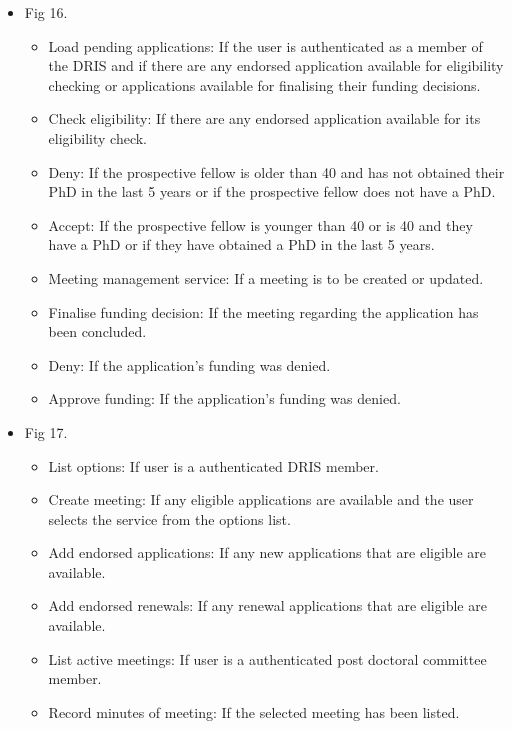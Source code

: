 \documentclass[12pt]{article}
\begin{document}
\begin{itemize}
	\item Fig 16.
		\begin{itemize}
			\item Load pending applications: If the user is authenticated as a member of the DRIS and if there are any endorsed application available for eligibility checking or applications available for finalising their funding decisions.
			\item Check eligibility: If there are any endorsed application available for its eligibility check.
			\item Deny: If the prospective fellow is older than 40 and has not obtained their PhD in the last 5 years or if the prospective fellow does not have a PhD.
			\item Accept: If the prospective fellow is younger than 40 or is 40 and they have a PhD or if they have obtained a PhD in the last 5 years.
			\item Meeting management service: If a meeting is to be created or updated. 
			\item Finalise funding decision: If the meeting regarding the application has been concluded.	
			\item Deny: If the application's funding was denied.			
			\item Approve funding: If the application's funding was denied.									
		\end{itemize}
	
	\item Fig 17.
		\begin{itemize}
			\item List options: If user is a authenticated DRIS member.
			\item Create meeting: If any eligible applications are available and the user selects the service from the options list.
			\item Add endorsed applications: If any new applications that are eligible are available.
			\item Add endorsed renewals: If any renewal applications that are eligible are available.
			\item List active meetings: If user is a authenticated post doctoral committee member.
			\item Record minutes of meeting: If the selected meeting has been listed.							
		\end{itemize}
	\end{itemize}
\end{document}
